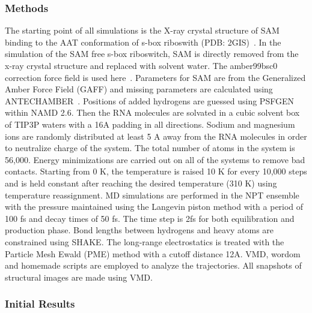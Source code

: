 \documentclass[a4paper,10pt]{article}
\begin{document}
\subsubsection*{Methods}

The starting point of all simulations is the X-ray crystal structure of SAM binding to the AAT conformation 
of s-box riboswith (PDB: 2GIS)~\cite{montange}. In the simulation of the SAM free s-box riboswitch, SAM 
is directly removed from the x-ray crystal structure and replaced with solvent water. The amber99bsc0
correction force field is used here~\cite{alberto}. Parameters for SAM are from the Generalized Amber 
Force Field (GAFF) and missing parameters are calculated using ANTECHAMBER~\cite{wang}. Positions 
of added hydrogens are guessed using PSFGEN within NAMD 2.6. Then the RNA molecules are solvated 
in a cubic solvent box of TIP3P waters with a 16A padding in all directions. Sodium and magnesium ions 
are randomly distributed at least 5 A away from the RNA molecules in order to neutralize charge of the 
system. The total number of atoms in the system is 56,000. Energy minimizations are carried out on all of the systems to remove bad contacts. Starting from 
0 K, the temperature is raised 10 K for every 10,000 steps and is held constant after reaching the desired 
temperature (310 K) using temperature reassignment. MD simulations are performed in the NPT ensemble 
with the pressure maintained using the Langevin piston method with a period of 100 fs and decay times of 
50 fs. The time step is 2fs for both equilibration and production phase. Bond lengths between hydrogens 
and heavy atoms are constrained using SHAKE. The long-range electrostatics is treated with the Particle 
Mesh Ewald (PME) method with a cutoff distance 12A.  VMD, wordom~\cite{moe} and homemade scripts are employed to analyze the trajectories. All snapshots 
of structural images are made using VMD.



\subsubsection*{Initial Results}
\end{document}
